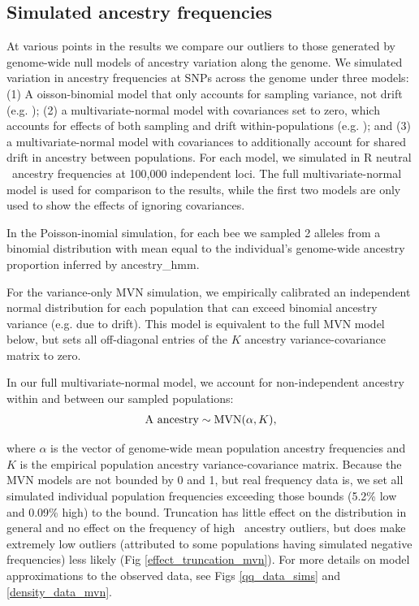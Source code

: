 \subsection*{Simulated ancestry frequencies}
At various points in the results we compare our outliers to those generated by genome-wide null models of ancestry variation along the genome. We simulated variation in ancestry frequencies at SNPs across the genome under three models: (1) A oisson-binomial model that only accounts for sampling variance, not drift (e.g. \cite{Nelson:2017cj}); (2) a multivariate-normal model with covariances set to zero, which accounts for effects of both sampling and drift within-populations (e.g. \cite{Long:1991tr}); and (3) a multivariate-normal model with covariances to additionally account for shared drift in ancestry between populations. For each model, we simulated in R neutral \A\ ancestry frequencies at 100,000 independent loci. The full multivariate-normal model is used for comparison to the results, while the first two models are only used to show the effects of ignoring covariances.

In the Poisson-inomial simulation, for each bee we sampled 2 alleles from a binomial distribution with mean equal to the individual's genome-wide ancestry proportion inferred by ancestry\_hmm.

For the variance-only MVN simulation, we empirically calibrated an independent normal distribution for each population that can exceed binomial ancestry variance (e.g. due to drift). This model is equivalent to the full MVN model below, but sets all off-diagonal entries of the $K$ ancestry variance-covariance matrix to zero.

In our full multivariate-normal model, we account for non-independent ancestry within and between our sampled populations:
\begin{align*}
   \text{{\color{black} A}\ ancestry} \sim \operatorname{MVN}(\alpha, K),
\end{align*}

where $\alpha$ is the vector of genome-wide mean population ancestry frequencies and $K$ is the empirical population ancestry variance-covariance matrix. Because the MVN models are not bounded by 0 and 1, but real frequency data is, we set all simulated individual population frequencies exceeding those bounds (5.2\% low and 0.09\% high) to the bound. Truncation has little effect on the distribution in general and no effect on the frequency of high \A\ ancestry outliers, but does make extremely low outliers (attributed to some populations having simulated negative frequencies) less likely (Fig \ref{effect_truncation_mvn}). For more details on model approximations to the observed data, see Figs \ref{qq_data_sims} and \ref{density_data_mvn}.


